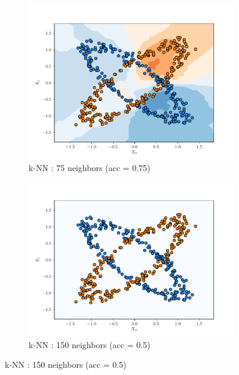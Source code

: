 \begin{figure}[H]
\begin{subfigure}{0.495\textwidth}
        \includegraphics[width=\textwidth]{resources/pdf/make_data2_knn_75.pdf}
        \caption{k-NN : 75 neighbors (acc = \num{0.75})}
    \end{subfigure}
    \begin{subfigure}{0.495\textwidth}
        \includegraphics[width=\textwidth]{resources/pdf/make_data2_knn_150.pdf}
        \caption{k-NN : 150 neighbors (acc = \num{0.5})}
    \end{subfigure}
    \label{fig:knn_make_data2}
\end{figure}

